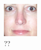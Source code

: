 


\begin{figure}[H]
\centering
\includegraphics[width=0.16\textwidth]{img/fd2/output12.png}
\caption{??}
\label{fig:fdResult}
\end{figure}


